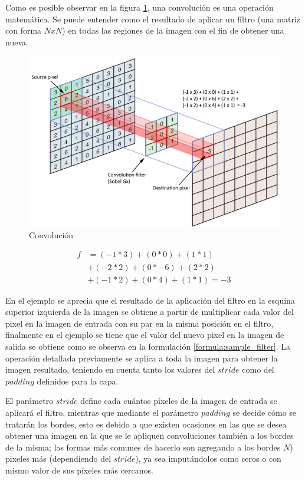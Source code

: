 Como es posible observar en la figura \ref{fig:convolution}, una convolución es una operación matemática. Se puede entender como el resultado de aplicar un filtro (una matriz con forma \(N x N\)) en todas las regiones de la imagen con el fin de obtener una nueva.
\begin{figure}[!h]
	\centering
	\includegraphics[width=0.7\linewidth]{images/convolution}
	\caption[Convolución]{Convolución}
	\label{fig:convolution}
\end{figure}

\begin{equation} \label{formula:sample_filter}
\begin{split}
f & = (-1 * 3) + (0 * 0) + (1 * 1) \\
& + (-2 * 2) + (0 * -6) + (2 * 2)\\
& + (-1 * 2) + (0 * 4) + (1 * 1) = -3 
\end{split}
\end{equation}

 En el ejemplo se aprecia que el resultado de la aplicación del filtro en la esquina superior izquierda de la imagen se obtiene a partir de multiplicar cada valor del pixel en la imagen de entrada con su par en la misma posición en el filtro, finalmente en el ejemplo se tiene que el valor del nuevo pixel en la imagen de salida se obtiene como se observa en la formulación \ref{formula:sample_filter}. La operación detallada previamente se aplica a toda la imagen para obtener la imagen resultado, teniendo en cuenta tanto los valores del \(stride\) como del \(padding\) definidos para la capa.
 
 El parámetro \(stride\) define cada cuántos píxeles de la imagen de entrada se aplicará el filtro, mientras que mediante el parámetro \(padding\) se decide cómo se tratarán los bordes, esto es debido a que existen ocasiones en las que se desea obtener una imagen en la que se le apliquen convoluciones también a los bordes de la misma; las formas más comunes de hacerlo son agregando a los bordes \(N\)) pixeles más (dependiendo del \(stride\)), ya sea imputándolos como ceros o con mismo valor de sus píxeles más cercanos. 
 
